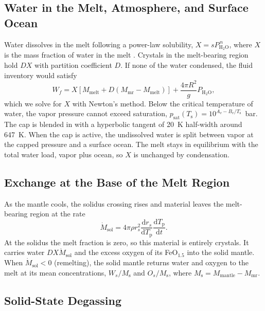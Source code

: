 \documentclass[11pt]{article}
\newcommand{\Tp}{T_\mathrm{p}}
\newcommand{\Ts}{T_\mathrm{s}}
\newcommand{\dd}{\mathrm{d}}
\begin{document}
\subsection{Water in the Melt, Atmosphere, and Surface Ocean}

Water dissolves in the melt following a power-law solubility, $X = s P_{\mathrm{H_2O}}^{\,n}$, where $X$ is the mass fraction of water in the melt \citep{Schaefer2016}. Crystals in the melt-bearing region hold $D X$ with partition coefficient $D$. If none of the water condensed, the fluid inventory would satisfy
\begin{equation}
W_f = X \left[ M_\mathrm{melt} + D (M_\mathrm{mr} - M_\mathrm{melt}) \right] + \frac{4 \pi R^2}{g} P_{\mathrm{H_2O}},
\end{equation}
which we solve for $X$ with Newton's method. Below the critical temperature of water, the vapor pressure cannot exceed saturation, $p_\mathrm{sat}(\Ts) = 10^{A_v - B_v / \Ts}$~bar. The cap is blended in with a hyperbolic tangent of 20~K half-width around 647~K. When the cap is active, the undissolved water is split between vapor at the capped pressure and a surface ocean. The melt stays in equilibrium with the total water load, vapor plus ocean, so $X$ is unchanged by condensation.

\subsection{Exchange at the Base of the Melt Region}

As the mantle cools, the solidus crossing rises and material leaves the melt-bearing region at the rate
\begin{equation}
\dot{M}_\mathrm{sol} = 4 \pi \rho r_s^2 \frac{\dd r_s}{\dd \Tp} \frac{\dd \Tp}{\dd t}.
\end{equation}
At the solidus the melt fraction is zero, so this material is entirely crystals. It carries water $D X \dot{M}_\mathrm{sol}$ and the excess oxygen of its FeO$_{1.5}$ into the solid mantle. When $\dot{M}_\mathrm{sol} < 0$ (remelting), the solid mantle returns water and oxygen to the melt at its mean concentrations, $W_s / M_\mathrm{s}$ and $O_s / M_\mathrm{s}$, where $M_\mathrm{s} = M_\mathrm{mantle} - M_\mathrm{mr}$.

\subsection{Solid-State Degassing}\label{sec:degassing}
\end{document}
